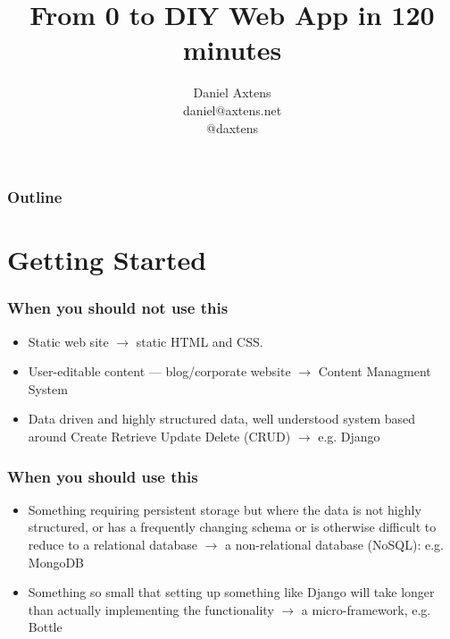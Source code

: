 \documentclass{beamer}
\title{From 0 to DIY Web App in 120 minutes}
\author[daniel@axtens.net]{Daniel Axtens\\daniel@axtens.net\\@daxtens}
\begin{document}
\begin{frame}[plain]
  \titlepage
\end{frame}


\begin{frame}
  \frametitle{Outline}
  \tableofcontents
\end{frame}


\section{Getting Started}

\begin{frame}
  \frametitle{When you should not use this}
  \begin{itemize}
  \item Static web site $\to$ static HTML and CSS.
  \item User-editable content --- blog/corporate website $\to$ Content Managment System
  \item Data driven and highly structured data, well understood
    system based around Create Retrieve Update Delete (CRUD) $\to$
    e.g. Django
  \end{itemize}
\end{frame}

\begin{frame}
  \frametitle{When you should use this}
  \begin{itemize}
  \item Something requiring persistent storage but where the data is
    not highly structured, or has a frequently changing schema or is
    otherwise difficult to reduce to a relational database $\to$ a
    non-relational database (NoSQL): e.g. MongoDB
  \item Something so small that setting up something like Django will
    take longer than actually implementing the functionality $\to$ a
    micro-framework, e.g. Bottle
  \end{itemize}
\end{frame}
\end{document}
